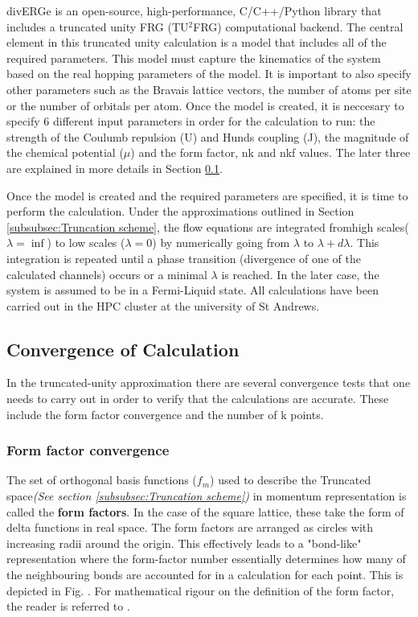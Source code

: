 \documentclass[12pt]{article}
\begin{document}
divERGe is an open-source, high-performance, C/C++/Python library that includes a truncated unity FRG (TU$^2$FRG) computational backend\cite{profe2024diverge}. 
The central element in this truncated unity calculation is a model that includes all of the required parameters. This model must capture the kinematics
of the system based on the real hopping parameters of the model. It is important to also specify other parameters such as  the Bravais lattice vectors, the number of atoms per site or the number 
of orbitals per atom. Once the model is created, it is neccesary to specify 6 different input parameters in order for the calculation to run: the strength of the Coulumb repulsion (U) and Hunds coupling (J), the magnitude of the chemical 
potential ($\mu$) and the form factor, nk and nkf values. The later three are explained in more details in Section \ref{subsec:convergence}.\par
\medskip
\noindent Once the model is created and the required parameters are specified, it is time to perform the calculation. Under the approximations outlined in Section \ref{subsubsec:Truncation scheme}, the flow equations
are integrated fromhigh scales($\lambda = \inf$) to low scales ($\lambda = 0$) by numerically going from $\lambda$ to $\lambda + d\lambda$.
This integration is repeated until a phase transition (divergence of one of the calculated channels) occurs or a minimal $\lambda$ is reached. 
In the later case, the system is assumed to be in a Fermi-Liquid state. 
All calculations have been carried out in the HPC cluster at the university of St Andrews. 


 

\subsection{Convergence of Calculation}
\label{subsec:convergence}
In the truncated-unity approximation there are several convergence tests that one needs to carry out in order to verify
that the calculations are accurate. These include the form factor convergence and the number of k points.

\subsubsection{Form factor convergence}

The set of orthogonal basis functions ($f_m$) used to describe the Truncated space\textit{(See section \ref{subsubsec:Truncation scheme})}
in momentum representation is called the \textbf{form factors}. In the case of the square lattice, 
these take the form of delta functions in real space. The form factors are arranged as circles with increasing radii around the origin. This effectively leads to a "bond-like" representation where the form-factor number
essentially determines how many of the neighbouring bonds are accounted for in a calculation for each point. This is depicted in Fig. . For mathematical rigour on the definition of the form factor, the reader is referred to \cite{lichtenstein2018functional}. \par
\end{document}
